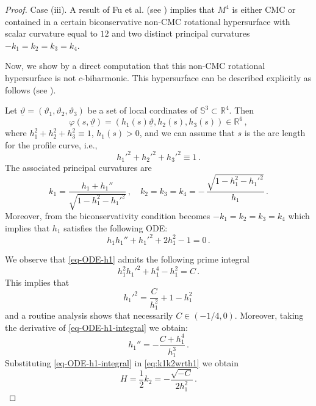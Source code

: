 \documentclass[11pt,leqno]{amsart}
\theoremstyle{plain}
\theoremstyle{definition}
\numberwithin{equation}{section}
\def \R{{\mathbb R}}
\def \s{{\mathbb S}}
\numberwithin{equation}{section}
\begin{document}
{\begin{proof}
Case (iii). A result of Fu et al. (see \cite[Theorem~1.4]{MR4903596}) implies that $M^4$ is either CMC or contained in a certain biconservative non-CMC rotational hypersurface with scalar curvature equal to $12$ and two distinct principal curvatures $-k_1=k_2=k_3=k_4$. 

Now, we show by a direct computation that this non-CMC rotational hypersurface is not $c$-biharmonic. This hypersurface can be described explicitly as follows (see \cite[Section~5]{MR4903596}).

Let $\underline{\vartheta}=(\vartheta_1,\vartheta_2,\vartheta_3)$ be a set of local cordinates of $\s^3 \subset \R^4$. Then
\[
\varphi\left (s,\underline{\vartheta} \right )=\left (h_1(s)\underline{\vartheta}, h_2(s),h_3(s)  \right ) \in \R^6\,,
\] 
where $h_1^2+h_2^2+h_3^2 \equiv 1$, $h_1(s)>0$,  and we can assume that $s$ is the arc length for the profile curve, i.e.,
\[
h_1'^2+h_2'^2+h_3'^2 \equiv 1\,.
\]
The associated principal curvatures are
\begin{equation}\label{eq:k1k2wrth1}
k_1=\frac{h_1+h_1''}{\sqrt{1-h_1^2-h_1'^2}}\,,\quad
k_2=k_3=k_4=-\,\frac{\sqrt{1-h_1^2-h_1'^2}}{h_1}\,.
\end{equation}
Moreover, from \cite[Proposition 2.2]{MR4552081} the biconservativity condition becomes $-k_1=k_2=k_3=k_4$ which implies that $h_1$ satisfies the following ODE:
\begin{equation}\label{eq-ODE-h1}
h_1h_1''+h_1'^2+2 h_1^2-1=0\,.
\end{equation}

We observe that \eqref{eq-ODE-h1} admits the following prime integral
\[
h_1^2 h_1'^2+ h_1^4-h_1^2=C\,.
\]
This implies that 
\begin{equation}\label{eq-ODE-h1-integral}
 h_1'^2=\frac{C}{h_1^2}+1-h_1^2\,
\end{equation}
and a routine analysis shows that necessarily $C\in(-1/4, 0)$. Moreover, taking the derivative of \eqref{eq-ODE-h1-integral} we obtain:
\begin{equation}\label{eq-ODE-h1-second}
 h_1''=-\frac{C+h_1^4}{h_1^3}\,.
\end{equation}
Substituting \eqref{eq-ODE-h1-integral} in \eqref{eq:k1k2wrth1} we obtain
\begin{equation}\label{eq:HinC}
H=\frac{1}{2} k_2=-\frac{\sqrt{-C}}{2 h_1^2}\,.
\end{equation}


\end{proof}}
\end{document}
